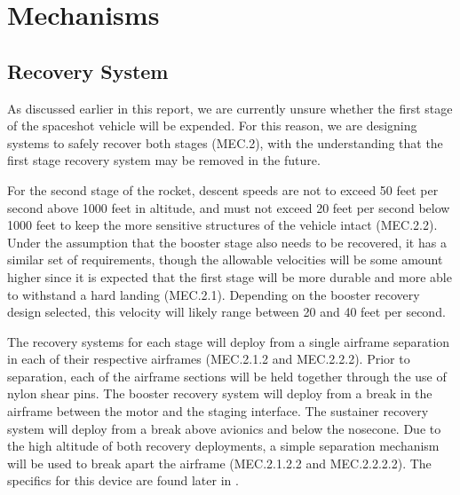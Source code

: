 \section{Mechanisms} \label{section:mechanisms}
\subsection{Recovery System}  %

As discussed earlier in this report, we are currently unsure whether the first stage of the spaceshot vehicle will be expended. For this reason, we are designing systems to safely recover both stages (MEC.2), with the understanding that the first stage recovery system may be removed in the future.

For the second stage of the rocket, descent speeds are not to exceed 50 feet per second above 1000 feet in altitude, and must not exceed 20 feet per second below 1000 feet to keep the more sensitive structures of the vehicle intact (MEC.2.2). Under the assumption that the booster stage also needs to be recovered, it has a similar set of requirements, though the allowable velocities will be some amount higher since it is expected that the first stage will be more durable and more able to withstand a hard landing (MEC.2.1). Depending on the booster recovery design selected, this velocity will likely range between 20 and 40 feet per second.

The recovery systems for each stage will deploy from a single airframe separation in each of their respective airframes (MEC.2.1.2 and MEC.2.2.2). Prior to separation, each of the airframe sections will be held together through the use of nylon shear pins. The booster recovery system will deploy from a break in the airframe between the motor and the staging interface. The sustainer recovery system will deploy from a break above avionics and below the nosecone. Due to the high altitude of both recovery deployments, a simple separation mechanism will be used to break apart the airframe (MEC.2.1.2.2 and MEC.2.2.2.2). The specifics for this device are found later in .

